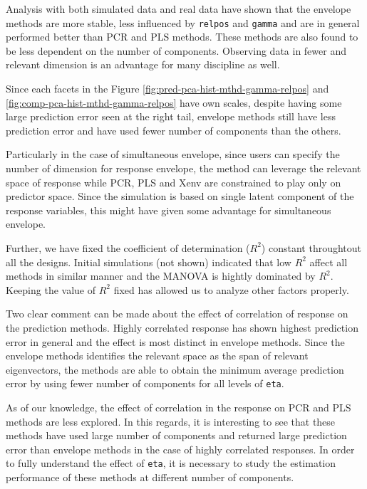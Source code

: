 \documentclass[12pt,3p,authoryear]{elsarticle}
\begin{document}
Analysis with both simulated data and real data have shown that the
envelope methods are more stable, less influenced by \texttt{relpos} and
\texttt{gamma} and are in general performed better than PCR and PLS
methods. These methods are also found to be less dependent on the number
of components. Observing data in fewer and relevant dimension is an
advantage for many discipline as well.

Since each facets in the Figure
\ref{fig:pred-pca-hist-mthd-gamma-relpos} and
\ref{fig:comp-pca-hist-mthd-gamma-relpos} have own scales, despite
having some large prediction error seen at the right tail, envelope
methods still have less prediction error and have used fewer number of
components than the others.

Particularly in the case of simultaneous envelope, since users can
specify the number of dimension for response envelope, the method can
leverage the relevant space of response while PCR, PLS and Xenv are
constrained to play only on predictor space. Since the simulation is
based on single latent component of the response variables, this might
have given some advantage for simultaneous envelope.

Further, we have fixed the coefficient of determination (\(R^2\))
constant throughtout all the designs. Initial simulations (not shown)
indicated that low \(R^2\) affect all methods in similar manner and the
MANOVA is hightly dominated by \(R^2\). Keeping the value of \(R^2\)
fixed has allowed us to analyze other factors properly.

Two clear comment can be made about the effect of correlation of
response on the prediction methods. Highly correlated response has shown
highest prediction error in general and the effect is most distinct in
envelope methods. Since the envelope methods identifies the relevant
space as the span of relevant eigenvectors, the methods are able to
obtain the minimum average prediction error by using fewer number of
components for all levels of \texttt{eta}.

As of our knowledge, the effect of correlation in the response on PCR
and PLS methods are less explored. In this regards, it is interesting to
see that these methods have used large number of components and returned
large prediction error than envelope methods in the case of highly
correlated responses. In order to fully understand the effect of
\texttt{eta}, it is necessary to study the estimation performance of
these methods at different number of components.
\end{document}
